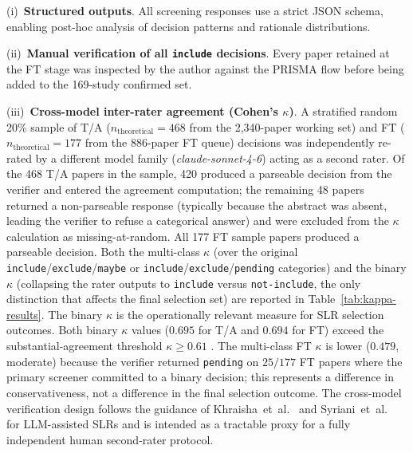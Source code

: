 (i)~\textbf{Structured outputs}. All screening responses use a strict JSON
schema, enabling post-hoc analysis of decision patterns and rationale
distributions.

(ii)~\textbf{Manual verification of all \texttt{include} decisions}.
Every paper retained at the FT stage was inspected by the author against the
PRISMA flow before being added to the 169-study confirmed set.

(iii)~\textbf{Cross-model inter-rater agreement (Cohen's $\kappa$)}.
A stratified random 20\% sample of T/A ($n_{\text{theoretical}} = 468$ from
the 2{,}340-paper working set) and FT ($n_{\text{theoretical}} = 177$ from
the 886-paper FT queue) decisions was independently re-rated by a different
model family (\textit{claude-sonnet-4-6}) acting as a second rater. Of the
468 T/A papers in the sample, 420 produced a parseable decision from the
verifier and entered the agreement computation; the remaining 48 papers
returned a non-parseable response (typically because the abstract was
absent, leading the verifier to refuse a categorical answer) and were
excluded from the $\kappa$ calculation as missing-at-random. All 177 FT
sample papers produced a parseable decision. Both the multi-class
$\kappa$ (over the original \texttt{include}/\texttt{exclude}/\texttt{maybe}
or \texttt{include}/\texttt{exclude}/\texttt{pending} categories) and the
binary $\kappa$ (collapsing the rater outputs to
\texttt{include} versus \texttt{not-include}, the only distinction that
affects the final selection set) are reported in
Table~\ref{tab:kappa-results}. The binary $\kappa$ is the operationally
relevant measure for SLR selection outcomes. Both binary $\kappa$ values
($0.695$ for T/A and $0.694$ for FT) exceed the substantial-agreement
threshold $\kappa \geq 0.61$ \cite{landiskoch1977}. The multi-class FT
$\kappa$ is lower ($0.479$, moderate) because the verifier returned
\texttt{pending} on $25/177$ FT papers where the primary screener committed
to a binary decision; this represents a difference in conservativeness, not
a difference in the final selection outcome. The cross-model verification
design follows the guidance of Khraisha~et~al.~\cite{khraisha2024} and
Syriani~et~al.~\cite{syriani2023} for LLM-assisted SLRs and is intended as a
tractable proxy for a fully independent human second-rater protocol.



